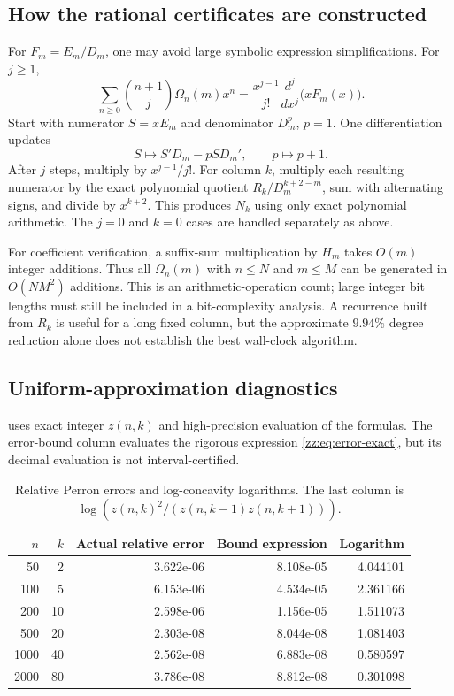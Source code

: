 \documentclass[11pt,a4paper]{article}
\theoremstyle{definition}
\newcommand{\Om}{\Omega}
\begin{document}
\subsection{How the rational certificates are constructed}
For $F_m=E_m/D_m$, one may avoid large symbolic expression simplifications.
For $j\ge1$,
\begin{equation}\label{zz:eq:derivative-certificate}
 \sum_{n\ge0}\binom{n+1}{j}\Om_n(m)x^n
 =\frac{x^{j-1}}{j!}\frac{d^j}{dx^j}\bigl(xF_m(x)\bigr).
\end{equation}
Start with numerator $S=xE_m$ and denominator $D_m^p$, $p=1$.
One differentiation updates
\[
 S\longmapsto S'D_m-pSD_m',\qquad p\longmapsto p+1.
\]
After $j$ steps, multiply by $x^{j-1}/j!$.
For column $k$, multiply each resulting numerator by the exact polynomial
quotient $R_k/D_m^{k+2-m}$, sum with alternating signs, and divide by
$x^{k+2}$.  This produces $N_k$ using only exact polynomial arithmetic.
The $j=0$ and $k=0$ cases are handled separately as above.

For coefficient verification, a suffix-sum multiplication by $H_m$ takes
$O(m)$ integer additions.  Thus all $\Om_n(m)$ with $n\le N$ and $m\le M$
can be generated in $O(NM^2)$ additions.  This is an arithmetic-operation
count; large integer bit lengths must still be included in a bit-complexity
analysis.  A recurrence built from $R_k$ is useful for a long fixed column,
but the approximate $9.94\%$ degree reduction alone does not establish the
best wall-clock algorithm.

\subsection{Uniform-approximation diagnostics}
 uses exact integer $z(n,k)$ and high-precision evaluation
of the formulas.  The error-bound column evaluates the rigorous expression
\eqref{zz:eq:error-exact}, but its decimal evaluation is not interval-certified.
\begin{table}[ht]
\centering\small
\caption{Relative Perron errors and log-concavity logarithms.  The last column
is $\log(z(n,k)^2/(z(n,k-1)z(n,k+1)))$.}
\begin{tabular}{rrrrr}
\toprule
$n$ & $k$ & Actual relative error & Bound expression & Logarithm\\
\midrule
50 & 2 & 3.622e-06 & 8.108e-05 & 4.044101 \\
100 & 5 & 6.153e-06 & 4.534e-05 & 2.361166 \\
200 & 10 & 2.598e-06 & 1.156e-05 & 1.511073 \\
500 & 20 & 2.303e-08 & 8.044e-08 & 1.081403 \\
1000 & 40 & 2.562e-08 & 6.883e-08 & 0.580597 \\
2000 & 80 & 3.786e-08 & 8.812e-08 & 0.301098 \\
\bottomrule
\end{tabular}
\label{zz:tab:asymptotic}
\end{table}
\end{document}
